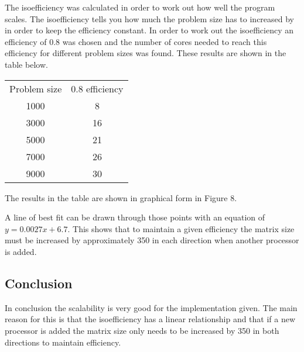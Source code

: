 \documentclass{article}
\begin{document}
The isoefficiency was calculated in order to work out how well the program scales.
The isoefficiency tells you how much the problem size has to increased by in order
to  keep the efficiency constant. In order to work out the isoefficiency an efficiency
of 0.8 was chosen and the number of cores needed to reach this efficiency
for different problem sizes was found. These results are shown in the table below.

\begin{center}
\begin{tabular}{ |c|c| }
 \hline
  Problem size & 0.8 efficiency\\
  1000 & 8\\
  3000 & 16\\
  5000 & 21\\
  7000 & 26\\
  9000 & 30\\
 \hline
\end{tabular}
\end{center}

The results in the table are shown in graphical form in Figure 8.

\begin{figure}[H]
 \centering
 \caption{}
 \label{fig:Isoefficiency}
\end{figure}

A line of best fit can be drawn through those points with an equation of
$y=0.0027x+6.7$. This shows that to maintain a given efficiency the matrix
size must be increased by approximately 350 in each direction when another processor is added.

\subsection{Conclusion}

In conclusion the scalability is very good for the implementation given. The main
reason for this is that the isoefficiency has a linear relationship and that if a
new processor is added the matrix size only needs to be increased by 350 in both
directions to maintain efficiency.
\end{document}
